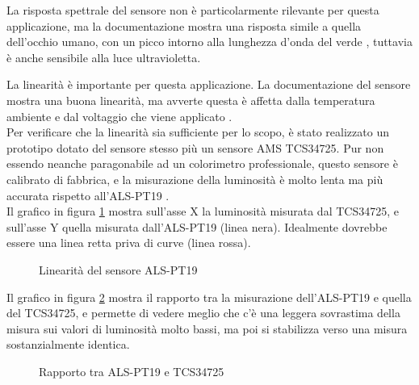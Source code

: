 La risposta spettrale del sensore non è particolarmente rilevante per questa applicazione, ma la documentazione mostra una risposta simile a quella dell'occhio umano, con un picco intorno alla lunghezza d'onda del verde \cite{als_pt19_datasheet}, tuttavia è anche sensibile alla luce ultravioletta.

La linearità è importante per questa applicazione. La documentazione del sensore mostra una buona linearità, ma avverte questa è affetta dalla temperatura ambiente e dal voltaggio che viene applicato \cite{als_pt19_datasheet}.\\
Per verificare che la linearità sia sufficiente per lo scopo, è stato realizzato un prototipo dotato del sensore stesso più un sensore AMS TCS34725. Pur non essendo neanche paragonabile ad un colorimetro professionale, questo sensore è calibrato di fabbrica, e la misurazione della luminosità è molto lenta ma più accurata rispetto all'ALS-PT19 \cite{tcs34725_datasheet}.\\
Il grafico in figura \ref{fig:pt19_linearity} mostra sull'asse X la luminosità misurata dal TCS34725, e sull'asse Y quella misurata dall'ALS-PT19 (linea nera). Idealmente dovrebbe essere una linea retta priva di curve (linea rossa).

\begin{figure}[h!]
	\centering
	\caption{Linearità del sensore ALS-PT19}
	\label{fig:pt19_linearity}
\end{figure}

Il grafico in figura \ref{fig:pt19_linearity3} mostra il rapporto tra la misurazione dell'ALS-PT19 e quella del TCS34725, e permette di vedere meglio che c'è una leggera sovrastima della misura sui valori di luminosità molto bassi, ma poi si stabilizza verso una misura sostanzialmente identica.
\begin{figure}[h!]
	\centering
	\caption{Rapporto tra ALS-PT19 e TCS34725}
	\label{fig:pt19_linearity3}
\end{figure}

